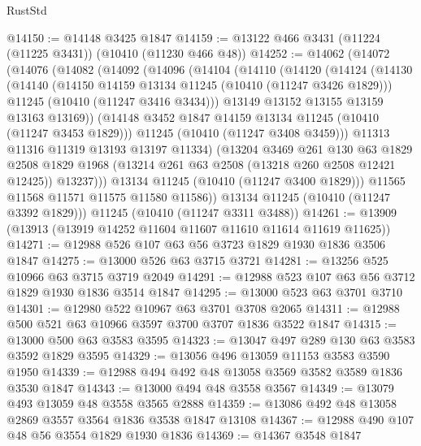 \begin{lexlean}{RustStd}
\begin{coremodule}
@14150 := @14148 @3425 @1847
@14159 := @13122 @466 @3431 (@11224 (@11225 @3431)) (@10410 (@11230 @466 @48))
@14252 := @14062
    (@14072
      (@14076
        (@14082
          (@14092
            (@14096
              (@14104
                (@14110
                  (@14120
                    (@14124
                      (@14130
                        (@14140
                          (@14150 @14159 @13134 @11245 (@10410 (@11247 @3426 @1829)))
                          @11245
                          (@10410 (@11247 @3416 @3434)))
                        @13149
                        @13152
                        @13155
                        @13159
                        @13163
                        @13169))
                    (@14148 @3452 @1847 @14159 @13134 @11245 (@10410 (@11247 @3453 @1829)))
                    @11245
                    (@10410 (@11247 @3408 @3459)))
                  @11313
                  @11316
                  @11319
                  @13193
                  @13197
                  @11334)
                (@13204
                  @3469
                  @261
                  @130
                  @63
                  @1829
                  @2508
                  @1829
                  @1968
                  (@13214 @261 @63 @2508 (@13218 @260 @2508 @12421 @12425))
                  @13237)))
            @13134
            @11245
            (@10410 (@11247 @3400 @1829)))
          @11565
          @11568
          @11571
          @11575
          @11580
          @11586))
      @13134
      @11245
      (@10410 (@11247 @3392 @1829)))
    @11245
    (@10410 (@11247 @3311 @3488))
@14261 := @13909 (@13913 (@13919 @14252 @11604 @11607 @11610 @11614 @11619 @11625))
@14271 := @12988 @526 @107 @63 @56 @3723 @1829 @1930 @1836 @3506 @1847
@14275 := @13000 @526 @63 @3715 @3721
@14281 := @13256 @525 @10966 @63 @3715 @3719 @2049
@14291 := @12988 @523 @107 @63 @56 @3712 @1829 @1930 @1836 @3514 @1847
@14295 := @13000 @523 @63 @3701 @3710
@14301 := @12980 @522 @10967 @63 @3701 @3708 @2065
@14311 := @12988 @500 @521 @63 @10966 @3597 @3700 @3707 @1836 @3522 @1847
@14315 := @13000 @500 @63 @3583 @3595
@14323 := @13047 @497 @289 @130 @63 @3583 @3592 @1829 @3595
@14329 := @13056 @496 @13059 @11153 @3583 @3590 @1950
@14339 := @12988 @494 @492 @48 @13058 @3569 @3582 @3589 @1836 @3530 @1847
@14343 := @13000 @494 @48 @3558 @3567
@14349 := @13079 @493 @13059 @48 @3558 @3565 @2888
@14359 := @13086 @492 @48 @13058 @2869 @3557 @3564 @1836 @3538 @1847 @13108
@14367 := @12988 @490 @107 @48 @56 @3554 @1829 @1930 @1836
@14369 := @14367 @3548 @1847

\end{coremodule}
\end{lexlean}
